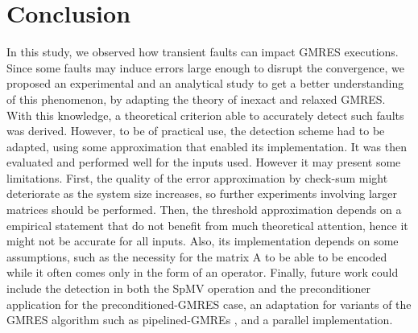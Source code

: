 \section{Conclusion}
In this study, we observed how transient faults can impact GMRES executions. Since some faults may induce errors large enough to disrupt the convergence, we proposed an experimental and an analytical study to get a better understanding of this phenomenon, by adapting the theory of inexact and relaxed GMRES. With this knowledge, a theoretical criterion able to accurately detect such faults was derived. However, to be of practical use, the detection scheme had to be adapted, using some approximation that enabled its implementation. It was then evaluated and performed well for the inputs used. However it may present some limitations. First, the quality of the error approximation by check-sum might deteriorate as the system size increases, so further experiments involving larger matrices should be performed. Then, the threshold approximation depends on a empirical statement that do not benefit from much theoretical attention, hence it might not be accurate for all inputs. Also, its implementation depends on some assumptions, such as the necessity for the matrix A to be able to be encoded while it often comes only in the form of an operator.
Finally, future work could include the detection in both the SpMV operation and the preconditioner application for the preconditioned-GMRES case, an adaptation for variants of the GMRES algorithm such as pipelined-GMREs \cite{pipelined_gmres}, and a parallel implementation.
